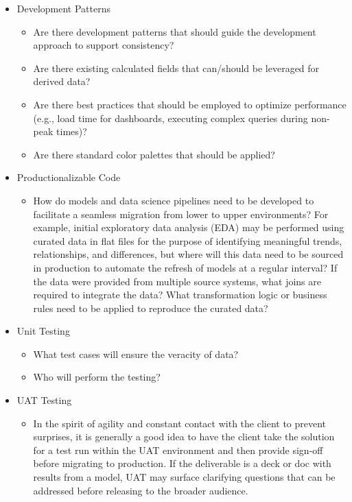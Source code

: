\documentclass[]{book}
\providecommand{\tightlist}{%
  \setlength{\itemsep}{0pt}\setlength{\parskip}{0pt}}
\begin{document}
\begin{itemize}
\item
  Development Patterns

  \begin{itemize}
  \tightlist
  \item
    Are there development patterns that should guide the development approach to support consistency?
  \item
    Are there existing calculated fields that can/should be leveraged for derived data?
  \item
    Are there best practices that should be employed to optimize performance (e.g., load time for dashboards, executing complex queries during non-peak times)?
  \item
    Are there standard color palettes that should be applied?
  \end{itemize}
\item
  Productionalizable Code

  \begin{itemize}
  \tightlist
  \item
    How do models and data science pipelines need to be developed to facilitate a seamless migration from lower to upper environments? For example, initial exploratory data analysis (EDA) may be performed using curated data in flat files for the purpose of identifying meaningful trends, relationships, and differences, but where will this data need to be sourced in production to automate the refresh of models at a regular interval? If the data were provided from multiple source systems, what joins are required to integrate the data? What transformation logic or business rules need to be applied to reproduce the curated data?
  \end{itemize}
\item
  Unit Testing

  \begin{itemize}
  \tightlist
  \item
    What test cases will ensure the veracity of data?
  \item
    Who will perform the testing?
  \end{itemize}
\item
  UAT Testing

  \begin{itemize}
  \tightlist
  \item
    In the spirit of agility and constant contact with the client to prevent surprises, it is generally a good idea to have the client take the solution for a test run within the UAT environment and then provide sign-off before migrating to production. If the deliverable is a deck or doc with results from a model, UAT may surface clarifying questions that can be addressed before releasing to the broader audience.
  \end{itemize}
\end{itemize}
\end{document}
